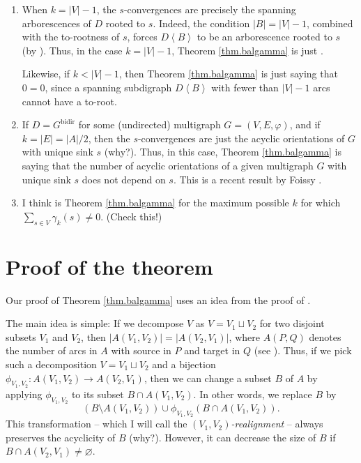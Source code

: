 \documentclass[numbers=enddot,12pt,final,onecolumn,notitlepage]{scrartcl}%
\theoremstyle{definition}
\let\sumnonlimits\sum
\renewcommand{\sum}{\sumnonlimits\limits}
\theoremstyle{plainsl}
\begin{document}
\begin{enumerate}
\item When $k=\left\vert V\right\vert -1$, the $s$-convergences are precisely
the spanning arborescences of $D$ rooted to $s$. Indeed, the condition
$\left\vert B\right\vert =\left\vert V\right\vert -1$, combined with the
to-rootness of $s$, forces $D\left\langle B\right\rangle $ to be an
arborescence rooted to $s$ (by \cite[Theorem 5.10.5]{22s}). Thus, in the case
$k=\left\vert V\right\vert -1$, Theorem \ref{thm.balgamma} is just
\cite[Corollary 5.12.1]{22s}.

Likewise, if $k<\left\vert V\right\vert -1$, then Theorem \ref{thm.balgamma}
is just saying that $0=0$, since a spanning subdigraph $D\left\langle
B\right\rangle $ with fewer than $\left\vert V\right\vert -1$ arcs cannot have
a to-root.

\item If $D=G^{\operatorname*{bidir}}$ for some (undirected) multigraph
$G=\left(  V,E,\varphi\right)  $, and if $k=\left\vert E\right\vert
=\left\vert A\right\vert /2$, then the $s$-convergences are just the acyclic
orientations of $G$ with unique sink $s$ (why?). Thus, in this case, Theorem
\ref{thm.balgamma} is saying that the number of acyclic orientations of a
given multigraph $G$ with unique sink $s$ does not depend on $s$. This is a
recent result by Foissy \cite[Proposition 4.6]{Foissy22}.

\item I think \cite[Proposition 3.7]{PerPha15} is Theorem \ref{thm.balgamma}
for the maximum possible $k$ for which $\sum_{s\in V}\gamma_{k}\left(
s\right)  \neq0$. (Check this!)
\end{enumerate}

\section{Proof of the theorem}

Our proof of Theorem \ref{thm.balgamma} uses an idea from the proof of
\cite[Proposition 3.7]{PerPha15}.

The main idea is simple: If we decompose $V$ as $V=V_{1}\sqcup V_{2}$ for two
disjoint subsets $V_{1}$ and $V_{2}$, then $\left\vert A\left(  V_{1}%
,V_{2}\right)  \right\vert =\left\vert A\left(  V_{2},V_{1}\right)
\right\vert $, where $A\left(  P,Q\right)  $ denotes the number of arcs in $A$
with source in $P$ and target in $Q$ (see \cite[Exercise 9.1]{22s}). Thus, if
we pick such a decomposition $V=V_{1}\sqcup V_{2}$ and a bijection
$\phi_{V_{1},V_{2}}:A\left(  V_{1},V_{2}\right)  \rightarrow A\left(
V_{2},V_{1}\right)  $, then we can change a subset $B$ of $A$ by applying
$\phi_{V_{1},V_{2}}$ to its subset $B\cap A\left(  V_{1},V_{2}\right)  $. In
other words, we replace $B$ by%
\[
\left(  B\setminus A\left(  V_{1},V_{2}\right)  \right)  \cup\phi_{V_{1}%
,V_{2}}\left(  B\cap A\left(  V_{1},V_{2}\right)  \right)  .
\]
This transformation -- which I will call the $\left(  V_{1},V_{2}\right)
$\emph{-realignment} -- always preserves the acyclicity of $B$ (why?).
However, it can decrease the size of $B$ if $B\cap A\left(  V_{2}%
,V_{1}\right)  \neq\varnothing$.
\end{document}
